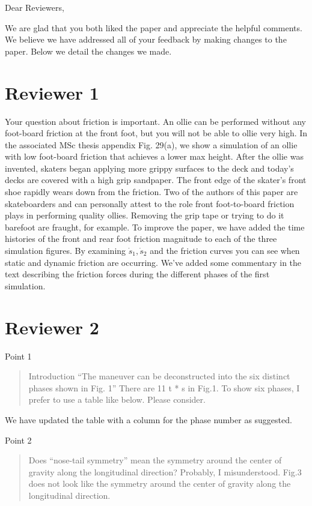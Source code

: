 \documentclass{letter}
\begin{document}
\begin{letter}{}
\opening{Dear Reviewers,}

We are glad that you both liked the paper and appreciate the helpful comments. We believe we have addressed all of your feedback by making changes to the paper. Below we detail the changes we made.

\section{Reviewer 1}

Your question about friction is important. An ollie can be performed without any foot-board friction at the front foot, but you will not be able to ollie very high. In the associated MSc thesis appendix Fig. 29(a), we show a simulation of an ollie with low foot-board friction that achieves a lower max height. After the ollie was invented, skaters began applying more grippy surfaces to the deck and today's decks are covered with a high grip sandpaper. The front edge of the skater's front shoe rapidly wears down from the friction. Two of the authors of this paper are skateboarders and can personally attest to the role front foot-to-board friction plays in performing quality ollies. Removing the grip tape or trying to do it barefoot are fraught, for example. To improve the paper, we have added the time histories of the front and rear foot friction magnitude to each of the three simulation figures. By examining \(\dot{s}_1,\dot{s}_2\) and the friction curves you can see when static and dynamic friction are occurring. We've added some commentary in the text describing the friction forces during the different phases of the first simulation.

\section{Reviewer 2}

Point 1

\begin{quote}
    Introduction ``The maneuver can be deconstructed into the six distinct phases shown in Fig. 1'' There are 11 t * s in Fig.1. To show six phases, I prefer to use a table like below. Please consider.
\end{quote}

We have updated the table with a column for the phase number as suggested.

Point 2

\begin{quote}
    Does ``nose-tail symmetry'' mean the symmetry around the center of gravity along the longitudinal direction? Probably, I misunderstood. Fig.3 does not look like the symmetry around the center of gravity along the longitudinal direction.
\end{quote}


\end{letter}
\end{document}
